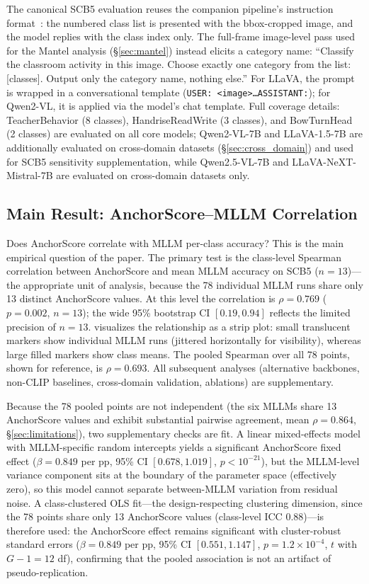 \documentclass[a4paper,fleqn]{cas-sc}
\begin{document}
The canonical SCB5 evaluation reuses the companion pipeline's instruction format~\cite{ma2026agreement}: the numbered class list is presented with the bbox-cropped image, and the model replies with the class index only. The full-frame image-level pass used for the Mantel analysis (\S\ref{sec:mantel}) instead elicits a category name: ``Classify the classroom activity in this image. Choose exactly one category from the list: [classes]. Output only the category name, nothing else.'' For LLaVA, the prompt is wrapped in a conversational template (\texttt{USER: <image>\ldots ASSISTANT:}); for Qwen2-VL, it is applied via the model's chat template. Full coverage details: TeacherBehavior (8 classes), HandriseReadWrite (3 classes), and BowTurnHead (2 classes) are evaluated on all core models; Qwen2-VL-7B and LLaVA-1.5-7B are additionally evaluated on cross-domain datasets (\S\ref{sec:cross_domain}) and used for SCB5 sensitivity supplementation, while Qwen2.5-VL-7B and LLaVA-NeXT-Mistral-7B are evaluated on cross-domain datasets only.

\subsection{Main Result: AnchorScore--MLLM Correlation}
\label{sec:main_result}

Does AnchorScore correlate with MLLM per-class accuracy? This is the main empirical question of the paper. The primary test is the class-level Spearman correlation between AnchorScore and mean MLLM accuracy on SCB5 ($n=13$)---the appropriate unit of analysis, because the 78 individual MLLM runs share only 13 distinct AnchorScore values. At this level the correlation is $\rho=0.769$ ($p=0.002$, $n=13$); the wide 95\% bootstrap CI $[0.19, 0.94]$ reflects the limited precision of $n=13$.  visualizes the relationship as a strip plot: small translucent markers show individual MLLM runs (jittered horizontally for visibility), whereas large filled markers show class means. The pooled Spearman over all 78 points, shown for reference, is $\rho=0.693$. All subsequent analyses (alternative backbones, non-CLIP baselines, cross-domain validation, ablations) are supplementary.

Because the 78 pooled points are not independent (the six MLLMs share 13 AnchorScore values and exhibit substantial pairwise agreement, mean $\rho=0.864$, \S\ref{sec:limitations}), two supplementary checks are fit. A linear mixed-effects model with MLLM-specific random intercepts yields a significant AnchorScore fixed effect ($\beta=0.849$ per pp, 95\% CI $[0.678, 1.019]$, $p<10^{-21}$), but the MLLM-level variance component sits at the boundary of the parameter space (effectively zero), so this model cannot separate between-MLLM variation from residual noise. A class-clustered OLS fit---the design-respecting clustering dimension, since the 78 points share only 13 AnchorScore values (class-level ICC 0.88)---is therefore used: the AnchorScore effect remains significant with cluster-robust standard errors ($\beta=0.849$ per pp, 95\% CI $[0.551, 1.147]$, $p=1.2\times10^{-4}$, $t$ with $G-1=12$ df), confirming that the pooled association is not an artifact of pseudo-replication.
\end{document}
